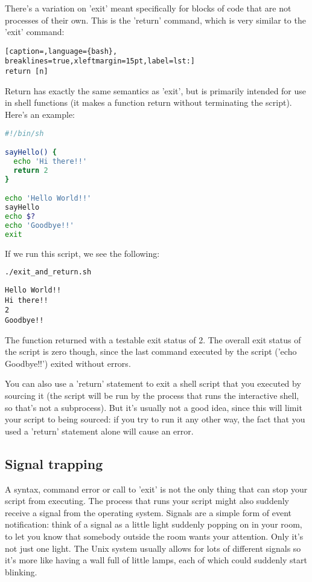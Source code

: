There's a variation on 'exit' meant specifically for blocks of code that are
not processes of their own. This is the 'return' command, which is very similar
to the 'exit' command:
\lstset{basicstyle=\scriptsize, numbers=left, captionpos=b, tabsize=4}
\begin{lstlisting}[caption=,language={bash},
breaklines=true,xleftmargin=15pt,label=lst:]
return [n]
\end{lstlisting}

Return has exactly the same semantics as 'exit', but is primarily intended for
use in shell functions (it makes a function return without terminating the
script). Here's an example:
\lstset{basicstyle=\scriptsize, numbers=left, captionpos=b, tabsize=4}
\begin{lstlisting}[caption=exitandreturn.sh,language={bash},
breaklines=true,xleftmargin=15pt,label=lst:exitandreturn.sh]
#!/bin/sh

sayHello() {
  echo 'Hi there!!'
  return 2
}

echo 'Hello World!!'
sayHello
echo $?
echo 'Goodbye!!'
exit
\end{lstlisting}

If we run this script, we see the following:
\lstset{basicstyle=\scriptsize, numbers=left, captionpos=b, tabsize=4}
\begin{lstlisting}[caption=Running the script,language={bash},
breaklines=true,xleftmargin=15pt,label=lst:Running the script]
./exit_and_return.sh
\end{lstlisting}

\scriptsize
\begin{verbatim}
Hello World!!
Hi there!!
2
Goodbye!!
\end{verbatim}
\normalsize

The function returned with a testable exit status of 2. The overall exit status
of the script is zero though, since the last command executed by the script
('echo Goodbye!!') exited without errors.

You can also use a 'return' statement to exit a shell script that you executed
by sourcing it (the script will be run by the process that runs the interactive
shell, so that's not a subprocess). But it's usually not a good idea, since
this will limit your script to being sourced: if you try to run it any other
way, the fact that you used a 'return' statement alone will cause an error.

\subsection{Signal trapping}
A syntax, command error or call to 'exit' is not the only thing that can stop
your script from executing. The process that runs your script might also
suddenly receive a signal from the operating system. Signals are a simple form
of event notification: think of a signal as a little light suddenly popping on
in your room, to let you know that somebody outside the room wants your
attention. Only it's not just one light. The Unix system usually allows for
lots of different signals so it's more like having a wall full of little lamps,
each of which could suddenly start blinking.

